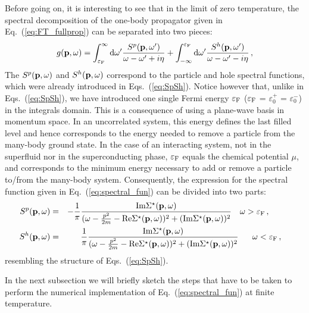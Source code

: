 Before going on, it is interesting to see that in the limit of zero temperature, the spectral decomposition of the one-body propagator given in Eq.~(\ref{eq:FT_fullprop}) can be separated into two pieces:
\begin{equation}
g({\bf p},\omega)=\int_{\varepsilon_\textrm F}^\infty\mathrm d\omega'\frac{S^p({\bf p},\omega')}{\omega-\omega'+i\eta}
+\int_{-\infty}^{\varepsilon_\textrm F}\mathrm d\omega'\frac{S^h({\bf p},\omega')}{\omega-\omega'-i\eta}\,,
\label{eq:Lehm_infty}
\end{equation}
The $S^p({\bf p},\omega)$ and $S^h({\bf p},\omega)$ correspond to the particle and hole spectral functions, which were already introduced in Eqs.~(\ref{eq:SpSh}). Notice however that, unlike in Eqs.~(\ref{eq:SpSh}), we have introduced one single Fermi energy $\varepsilon_\textrm F$ ($\varepsilon_\textrm F$ = $\varepsilon_0^+$ = $\varepsilon_0^-$) in the integrals domain. This is a consequence of using a plane-wave basis in momentum space. In an uncorrelated system, this energy defines the last filled level and hence corresponds to the energy needed to remove a particle from the many-body ground state. In the case of an interacting system, not in the superfluid nor in the superconducting phase, $\varepsilon_\textrm F$ equals the chemical potential $\mu$, and corresponds to the minimum energy necessary to add or remove a particle to/from the many-body system. Consequently, the expression for the spectral function given in Eq.~(\ref{eq:spectral_fun}) can be divided into two parts:
\begin{eqnarray}
S^p({\bf p},\omega)&=&-\frac{1}{\pi}\frac{\mathrm{Im}\Sigma^\star({\bf p},\omega)}
{(\omega-\frac{p^2}{2m}-\mathrm{Re}\Sigma^\star({\bf p},\omega))^2+(\rm{Im}\Sigma^\star({\bf p},\omega))^2} \quad \omega>\varepsilon_\textrm F\,,\qquad\,\,\,
\label{eq:Sp_self}
\\ 
S^h({\bf p},\omega)&=&\frac{1}{\pi}\frac{\mathrm{Im}\Sigma^\star({\bf p},\omega)}
{(\omega-\frac{p^2}{2m}-\mathrm{Re}\Sigma^\star({\bf p},\omega))^2+(\rm{Im}\Sigma^\star({\bf p},\omega))^2} \quad\,\,\,\, \omega<\varepsilon_\textrm F\,,\quad
\label{eq:Sh_self}
\end{eqnarray}
resembling the structure of Eqs.~(\ref{eq:SpSh}).

In the next subsection we will briefly sketch the steps that have to be taken to perform the numerical implementation of Eq.~(\ref{eq:spectral_fun}) at finite temperature.

